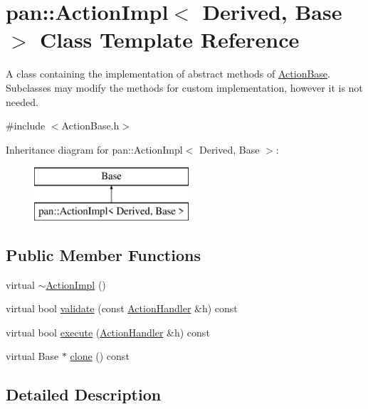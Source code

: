 \hypertarget{classpan_1_1_action_impl}{}\section{pan\+:\+:Action\+Impl$<$ Derived, Base $>$ Class Template Reference}
\label{classpan_1_1_action_impl}


A class containing the implementation of abstract methods of \hyperlink{classpan_1_1_action_base}{Action\+Base}. Subclasses may modify the methods for custom implementation, however it is not needed.  




{\ttfamily \#include $<$Action\+Base.\+h$>$}

Inheritance diagram for pan\+:\+:Action\+Impl$<$ Derived, Base $>$\+:\begin{figure}[H]
\begin{center}
\leavevmode
\includegraphics[height=2.000000cm]{classpan_1_1_action_impl}
\end{center}
\end{figure}
\subsection*{Public Member Functions}
\begin{DoxyCompactItemize}
\item 
virtual \hyperlink{classpan_1_1_action_impl_a331fd4215f8a98e88ab05b9e361ce830}{$\sim$\+Action\+Impl} ()
\item 
virtual bool \hyperlink{classpan_1_1_action_impl_acea764a5b41d2fd21717089e21d0c6f4}{validate} (const \hyperlink{classpan_1_1_action_handler}{Action\+Handler} \&h) const
\item 
virtual bool \hyperlink{classpan_1_1_action_impl_a14d72469bea6d60603d49e4815accb54}{execute} (\hyperlink{classpan_1_1_action_handler}{Action\+Handler} \&h) const
\item 
virtual Base $\ast$ \hyperlink{classpan_1_1_action_impl_af94569c5a40d1de5c161282000c1a4c7}{clone} () const
\end{DoxyCompactItemize}


\subsection{Detailed Description}
